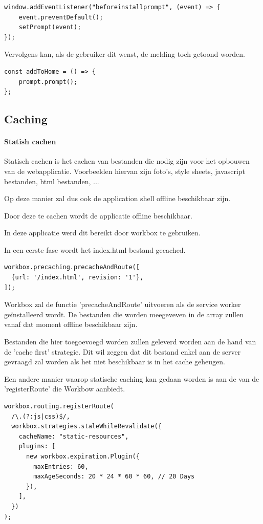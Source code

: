 \begin{lstlisting}
window.addEventListener("beforeinstallprompt", (event) => {
	event.preventDefault();
	setPrompt(event);
}); 
\end{lstlisting}

		Vervolgens kan, als de gebruiker dit wenst, de melding toch getoond worden.
		
\begin{lstlisting}
const addToHome = () => {
	prompt.prompt();
};
\end{lstlisting}
	\subsection{Caching}
		\paragraph{Statish cachen}
			Statisch cachen is het cachen van bestanden die nodig zijn voor het opbouwen van de webapplicatie. Voorbeelden hiervan zijn foto's, style sheets, javascript bestanden, html bestanden, ...
			
			Op deze manier zal dus ook de application shell offline beschikbaar zijn.
			
			Door deze te cachen wordt de applicatie offline beschikbaar.
			
			In deze applicatie werd dit bereikt door workbox te gebruiken.
			
			In een eerste fase wordt het index.html bestand gecached.
\begin{lstlisting}
workbox.precaching.precacheAndRoute([
  {url: '/index.html', revision: '1'},
]);
\end{lstlisting}
		
			Workbox zal de functie 'precacheAndRoute' uitvoeren als de service worker geïnstalleerd wordt. De bestanden die worden meegeveven in de array zullen vanaf dat moment offline beschikbaar zijn.
			\autocite{Workbox2020a}
			
			Bestanden die hier toegoevoegd worden zullen geleverd worden aan de hand van de 'cache first' strategie. Dit wil zeggen dat dit bestand enkel aan de server gevraagd zal worden als het niet beschikbaar is in het cache geheugen.
			
			Een andere manier waarop statische caching kan gedaan worden is aan de van de 'registerRoute' die Workbow aanbiedt. 
			
\begin{lstlisting}
workbox.routing.registerRoute(
  /\.(?:js|css)$/,
  workbox.strategies.staleWhileRevalidate({
    cacheName: "static-resources",
    plugins: [
      new workbox.expiration.Plugin({
        maxEntries: 60,
        maxAgeSeconds: 20 * 24 * 60 * 60, // 20 Days
      }),
    ],
  })
);
\end{lstlisting}
			

